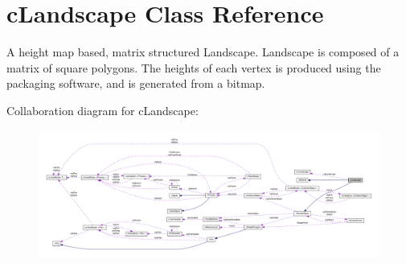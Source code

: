 \hypertarget{classc_landscape}{
\section{cLandscape Class Reference}
\label{classc_landscape}
}


A height map based, matrix structured Landscape. Landscape is composed of a matrix of square polygons. The heights of each vertex is produced using the packaging software, and is generated from a bitmap.  




Collaboration diagram for cLandscape:\nopagebreak
\begin{figure}[H]
\begin{center}
\leavevmode
\includegraphics[width=400pt]{classc_landscape__coll__graph}
\end{center}
\end{figure}
